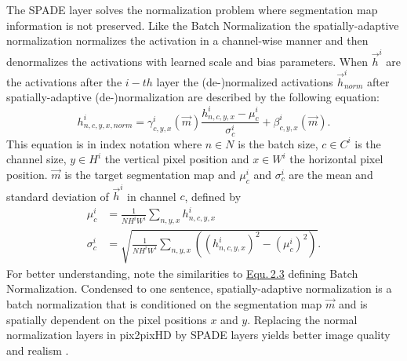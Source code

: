 The SPADE layer solves the normalization problem where segmentation map information is not preserved. Like the Batch Normalization the spatially-adaptive normalization normalizes the activation in a channel-wise manner and then denormalizes the activations with learned scale and bias parameters. When $\vec{h}^i$ are the activations after the $i{-}th$ layer the (de-)normalized activations $\vec{h}_{norm}^i$ after spatially-adaptive (de-)normalization are described by the following equation:
%
\begin{equation}
    h_{n,c,y,x,norm}^i=\gamma_{c,y,x}^i(\vec{m})\frac{h_{n,c,y,x}^i-\mu_c^i}{\sigma_c^i}+\beta_{c,y,x}^i(\vec{m}).
\end{equation}
%
This equation is in index notation where $n\in N$ is the batch size, $c\in C^i$ is the channel size, $y\in H^i$ the vertical pixel position and $x\in W^i$ the horizontal pixel position. $\vec{m}$ is the target segmentation map and $\mu_c^i$ and $\sigma_c^i$ are the mean and standard deviation of $\vec{h}^i$ in channel $c$, defined by 
%
\begin{align}
    \mu_c^i&=\frac{1}{NH^iW^i}\sum_{n,y,x}h_{n,c,y,x}^i\\[1ex]
    \sigma_c^i&=\sqrt{\frac{1}{NH^iW^i}\sum_{n,y,x}\left((h_{n,c,y,x}^i)^2-(\mu_c^i)^2\right)}.
\end{align}
%
For better understanding, note the similarities to \hyperref[equ:2.3]{Equ.\,2.3} defining Batch Normalization. Condensed to one sentence, spatially-adaptive normalization is a batch normalization that is conditioned on the segmentation map $\vec{m}$ and is spatially dependent on the pixel positions $x$ and $y$. Replacing the normal normalization layers in pix2pixHD by SPADE layers yields better image quality and realism \cite{spade}.